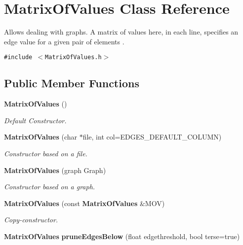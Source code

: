 \section{Matrix\-Of\-Values Class Reference}
\label{classMatrixOfValues}
Allows dealing with graphs. A matrix of values here, in each line, specifies an edge value for a given pair of elements .  


{\tt \#include $<$Matrix\-Of\-Values.h$>$}

\subsection*{Public Member Functions}
\begin{CompactItemize}
\item 
{\bf Matrix\-Of\-Values} ()\label{classMatrixOfValues_a0}

\begin{CompactList}\small\item\em Default Constructor. \item\end{CompactList}\item 
{\bf Matrix\-Of\-Values} (char $\ast$file, int col=EDGES\_\-DEFAULT\_\-COLUMN)\label{classMatrixOfValues_a1}

\begin{CompactList}\small\item\em Constructor based on a file. \item\end{CompactList}\item 
{\bf Matrix\-Of\-Values} (graph Graph)\label{classMatrixOfValues_a2}

\begin{CompactList}\small\item\em Constructor based on a graph. \item\end{CompactList}\item 
{\bf Matrix\-Of\-Values} (const {\bf Matrix\-Of\-Values} \&MOV)\label{classMatrixOfValues_a3}

\begin{CompactList}\small\item\em Copy-constructor. \item\end{CompactList}\item 
{\bf Matrix\-Of\-Values} {\bf prune\-Edges\-Below} (float edgethreshold, bool terse=true)\label{classMatrixOfValues_a4}


\end{CompactItemize}
